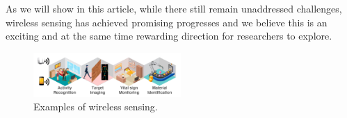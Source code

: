 As we will show in this article, while there still remain unaddressed challenges, wireless sensing has achieved promising progresses and we believe this is an exciting and at the same time rewarding direction for researchers to explore.



\begin{figure} [t!]
\centering
\includegraphics[width=0.5\textwidth]{figures/scenarios.pdf}
\caption{Examples of wireless sensing.}
\label{fig:scenarios}
\end{figure}


